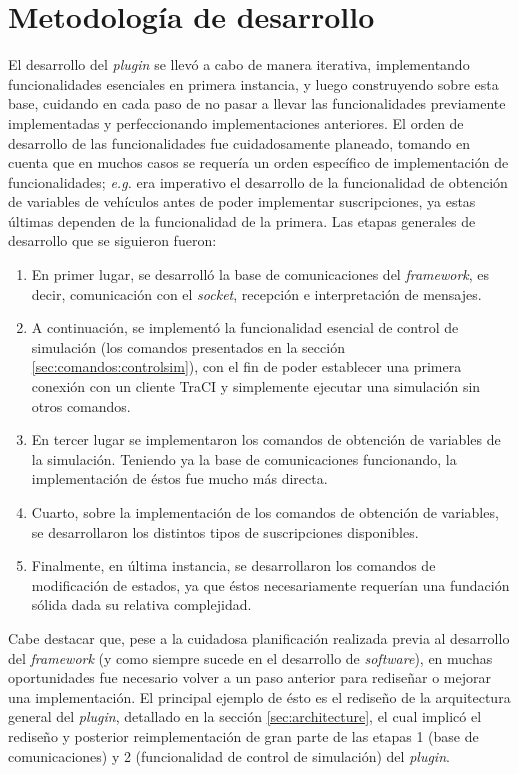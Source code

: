 \section{Metodología de desarrollo}

El desarrollo del \emph{plugin} se llevó a cabo de manera iterativa, implementando funcionalidades esenciales en primera instancia, y luego construyendo sobre esta base, cuidando en cada paso de no pasar a llevar las funcionalidades previamente implementadas y perfeccionando implementaciones anteriores. El orden de desarrollo de las funcionalidades fue cuidadosamente planeado, tomando en cuenta que en muchos casos se requería un orden específico de implementación de funcionalidades; \emph{e.g.} era imperativo el desarrollo de la funcionalidad de obtención de variables de vehículos antes de poder implementar suscripciones, ya estas últimas dependen de la funcionalidad de la primera. Las etapas generales de desarrollo que se siguieron fueron:

\begin{enumerate}
    \item En primer lugar, se desarrolló la base de comunicaciones del \emph{framework}, es decir, comunicación con el \emph{socket}, recepción e interpretación de mensajes. 
    
    \item A continuación, se implementó la funcionalidad esencial de control de simulación (los comandos presentados en la sección \ref{sec:comandos:controlsim}), con el fin de poder establecer una primera conexión con un cliente TraCI y simplemente ejecutar una simulación sin otros comandos.
    
    \item En tercer lugar se implementaron los comandos de obtención de variables de la simulación. Teniendo ya la base de comunicaciones funcionando, la implementación de éstos fue mucho más directa.
    
    \item Cuarto, sobre la implementación de los comandos de obtención de variables, se desarrollaron los distintos tipos de suscripciones disponibles.
    
    \item Finalmente, en última instancia, se desarrollaron los comandos de modificación de estados, ya que éstos necesariamente requerían una fundación sólida dada su relativa complejidad.
\end{enumerate}

Cabe destacar que, pese a la cuidadosa planificación realizada previa al desarrollo del \emph{framework} (y como siempre sucede en el desarrollo de \emph{software}), en muchas oportunidades fue necesario volver a un paso anterior para rediseñar o mejorar una implementación. El principal ejemplo de ésto es el rediseño de la arquitectura general del \emph{plugin}, detallado en la sección \ref{sec:architecture}, el cual implicó el rediseño y posterior reimplementación de gran parte de las etapas 1 (base de comunicaciones) y 2 (funcionalidad de control de simulación) del \emph{plugin}.

